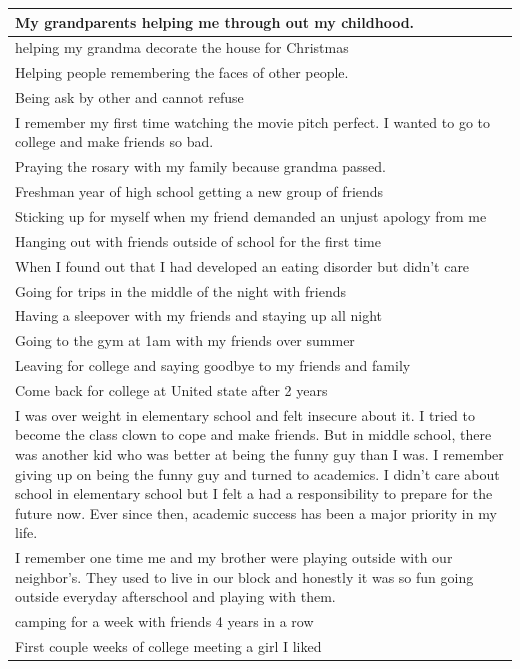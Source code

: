 \documentclass[
  .7em,
  letterpaper,
  DIV=11,
  numbers=noendperiod]{scrartcl}
\begin{document}
\begin{table}
\begin{tabular}{l}
\hline
My grandparents helping me through out my childhood.\\
\hline
helping my grandma decorate the house for Christmas\\
\hline
Helping people remembering the faces of other people.\\
\hline
Being ask by other and cannot refuse\\
\hline
I remember my first time watching the movie pitch perfect. I wanted to go to college and make friends so bad.\\
\hline
Praying the rosary with my family because grandma passed.\\
\hline
Freshman year of high school getting a new group of friends\\
\hline
Sticking up for myself when my friend demanded an unjust apology from me\\
\hline
Hanging out with friends outside of school for the first time\\
\hline
When I found out that I had developed an eating disorder but didn’t care\\
\hline
Going for trips in the middle of the night with friends\\
\hline
Having a sleepover with my friends and staying up all night\\
\hline
Going to the gym at 1am with my friends over summer\\
\hline
Leaving for college and saying goodbye to my friends and family\\
\hline
Come back for college at United state after 2 years\\
\hline
I was over weight in elementary school and felt insecure about it. I tried to become the class clown to cope and make friends. But in middle school, there was another kid who was better at being the funny guy than I was. I remember giving up on being the funny guy and turned to academics. I didn’t care about school in elementary school but I felt a had a responsibility to prepare for the future now. Ever since then, academic success has been a major priority in my life.\\
\hline
I remember one time me and my brother were playing outside with our neighbor's. They used to live in our block and honestly it was so fun going outside everyday afterschool and playing with them.\\
\hline
camping for a week with friends 4 years in a row\\
\hline
First couple weeks of college meeting a girl I liked\\

\end{tabular}
\end{table}
\end{document}
